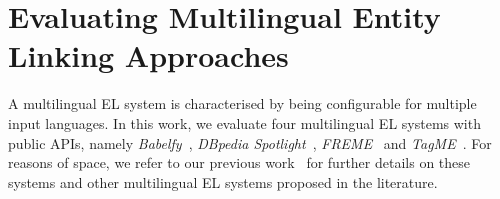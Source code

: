 \documentclass{llncs}
\begin{document}
\section{Evaluating Multilingual Entity Linking Approaches}

 
A multilingual EL system is characterised by being configurable for multiple input languages. In this work, we evaluate four multilingual EL systems with public APIs, namely \textit{Babelfy}~\cite{Babelfy-moro2014entity}, \textit{DBpedia Spotlight}~\cite{daiber2013improving}, \textit{FREME}~\cite{freme-ner2016} and \textit{TagME}~\cite{ferragina2010tagme}. For reasons of space, we refer to our previous work~\cite{ourLD4ID2017,ourISWC} for further details on these systems and other multilingual EL systems proposed in the literature.

\end{document}
